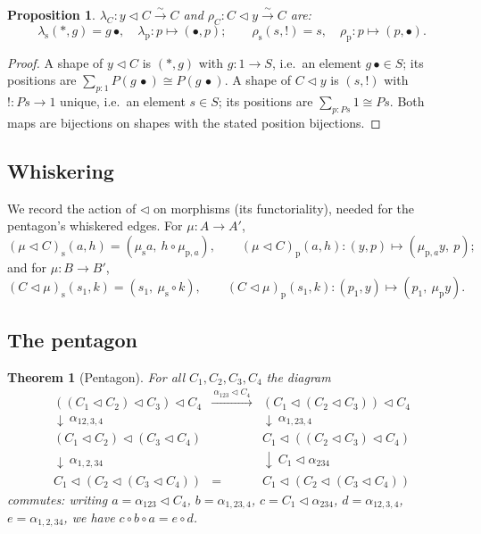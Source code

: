 \documentclass[11pt]{article}
\newtheorem{theorem}{Theorem}
\newtheorem{proposition}{Proposition}
\theoremstyle{definition}
\newcommand{\tri}{\mathbin{\triangleleft}}
\begin{document}
\begin{proposition}\label{prop:unitors}
$\lambda_C\colon y\tri C\xrightarrow{\sim}C$ and
$\rho_C\colon C\tri y\xrightarrow{\sim}C$ are:
\[
  \lambda_{\mathrm s}(\ast,g)=g\,\bullet,\quad
  \lambda_{\mathrm p}\colon p\mapsto(\bullet,p);
  \qquad
  \rho_{\mathrm s}(s,!)=s,\quad
  \rho_{\mathrm p}\colon p\mapsto(p,\bullet).
\]
\end{proposition}

\begin{proof}
A shape of $y\tri C$ is $(\ast,g)$ with $g\colon 1\to S$, i.e.\ an element
$g\,\bullet\in S$; its positions are $\sum_{p:1}P(g\,\bullet)\cong P(g\,\bullet)$.
A shape of $C\tri y$ is $(s,!)$ with $!\colon P s\to 1$ unique, i.e.\ an element
$s\in S$; its positions are $\sum_{p:P s}1\cong P s$. Both maps are bijections on
shapes with the stated position bijections.
\end{proof}

\subsection{Whiskering}\label{sec:whisker}

We record the action of $\tri$ on morphisms (its functoriality), needed for the
pentagon's whiskered edges. For $\mu\colon A\to A'$,
\[
  (\mu\tri C)_{\mathrm s}(a,h)=(\mu_{\mathrm s}a,\ h\circ\mu_{\mathrm p,a}),
  \qquad
  (\mu\tri C)_{\mathrm p}(a,h)\colon (y,p)\mapsto(\mu_{\mathrm p,a}y,\ p);
\]
and for $\mu\colon B\to B'$,
\[
  (C\tri\mu)_{\mathrm s}(s_1,k)=(s_1,\ \mu_{\mathrm s}\circ k),
  \qquad
  (C\tri\mu)_{\mathrm p}(s_1,k)\colon (p_1,y)\mapsto(p_1,\ \mu_{\mathrm p}y).
\]

\subsection{The pentagon}\label{sec:pentagon}

\begin{theorem}[Pentagon]\label{thm:pentagon}
For all $C_1,C_2,C_3,C_4$ the diagram
\[
\begin{array}{ccc}
((C_1\tri C_2)\tri C_3)\tri C_4
  &\xrightarrow{\ \alpha_{123}\tri C_4\ }&
(C_1\tri(C_2\tri C_3))\tri C_4\\[2pt]
\downarrow\ \alpha_{12,3,4}& &\downarrow\ \alpha_{1,23,4}\\[2pt]
(C_1\tri C_2)\tri(C_3\tri C_4)& &C_1\tri((C_2\tri C_3)\tri C_4)\\[2pt]
\downarrow\ \alpha_{1,2,34}& &\downarrow\ C_1\tri\alpha_{234}\\[2pt]
C_1\tri(C_2\tri(C_3\tri C_4))&=&C_1\tri(C_2\tri(C_3\tri C_4))
\end{array}
\]
commutes: writing $a=\alpha_{123}\tri C_4$, $b=\alpha_{1,23,4}$,
$c=C_1\tri\alpha_{234}$, $d=\alpha_{12,3,4}$, $e=\alpha_{1,2,34}$, we have
$c\circ b\circ a = e\circ d$.
\end{theorem}
\end{document}
